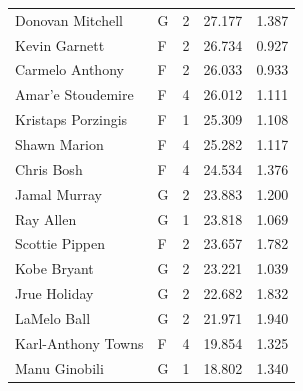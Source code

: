 \begin{table}[t]
\begin{tabular*}{\linewidth}{@{\extracolsep{\fill}}llcrr}
Donovan Mitchell & G & 2 & 27.177 & 1.387 \\ 
Kevin Garnett & F & 2 & 26.734 & 0.927 \\ 
Carmelo Anthony & F & 2 & 26.033 & 0.933 \\ 
Amar'e Stoudemire & F & 4 & 26.012 & 1.111 \\ 
Kristaps Porzingis & F & 1 & 25.309 & 1.108 \\ 
Shawn Marion & F & 4 & 25.282 & 1.117 \\ 
Chris Bosh & F & 4 & 24.534 & 1.376 \\ 
Jamal Murray & G & 2 & 23.883 & 1.200 \\ 
Ray Allen & G & 1 & 23.818 & 1.069 \\ 
Scottie Pippen & F & 2 & 23.657 & 1.782 \\ 
Kobe Bryant & G & 2 & 23.221 & 1.039 \\ 
Jrue Holiday & G & 2 & 22.682 & 1.832 \\ 
LaMelo Ball & G & 2 & 21.971 & 1.940 \\ 
Karl-Anthony Towns & F & 4 & 19.854 & 1.325 \\ 
Manu Ginobili & G & 1 & 18.802 & 1.340 \\ 
\bottomrule
\end{tabular*}
\end{table}

